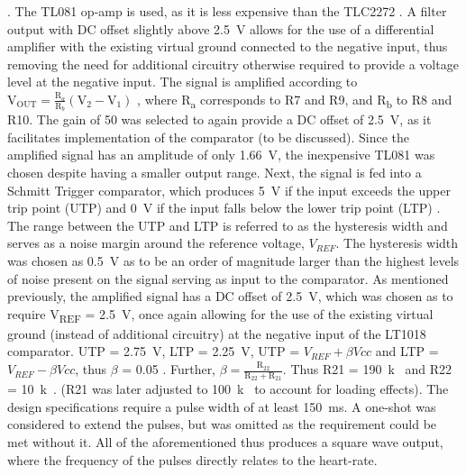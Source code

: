 \cite{filter}. The TL081 op-amp is used, as it is less expensive than the TLC2272 \cite{octo}. A filter output with DC offset slightly above \SI{2.5}{V} allows for the use of a differential amplifier with the existing virtual ground connected to the negative input, thus removing the need for additional circuitry otherwise required to provide a voltage level at the negative input. The signal is amplified according to $\mathrm{V}_{\mathrm{OUT}}=\frac{\mathrm{R}_{a}}{\mathrm{R}_{b}}\left(\mathrm{V}_{2}-\mathrm{V}_{1}\right)$ \cite{opamp}, where R\textsubscript{a} corresponds to R7 and R9, and R\textsubscript{b} to R8 and R10. The gain of 50 was selected to again provide a DC offset of \SI{2.5}{V}, as it facilitates implementation of the comparator (to be discussed). Since the amplified signal has an amplitude of only \SI{1.66}{V}, the inexpensive TL081 was chosen despite having a smaller output range. Next, the signal is fed into a Schmitt Trigger comparator, which produces \SI{5}{V} if the input exceeds the upper trip point (UTP) and \SI{0}{V} if the input falls below the lower trip point (LTP) \cite{schmitt}. The range between the UTP and LTP is referred to as the hysteresis width and serves as a noise margin \cite{schmitt} around the reference voltage, $V_{REF}$. The hysteresis width was chosen as \SI{0.5}{V} as to be an order of magnitude larger than the highest levels of noise present on the signal serving as input to the comparator. As mentioned previously, the amplified signal has a DC offset of \SI{2.5}{V}, which was chosen as to require V\textsubscript{REF} = \SI{2.5}{V}, once again allowing for the use of the existing virtual ground (instead of additional circuitry) at the negative input of the LT1018 comparator. UTP = \SI{2.75}{V}, LTP = \SI{2.25}{V}, UTP = $V_{REF} + \beta Vcc$ and LTP = $V_{REF} - \beta Vcc$, thus $\beta$ = 0.05 \cite{schmitt}. Further, $\beta=\frac{\mathrm{R}_{22}}{\mathrm{R}_{22}+\mathrm{R}_{21}}$. Thus R21 = \SI{190}{k\Omega} and R22 = \SI{10}{k\Omega}. (R21 was later adjusted to \SI{100}{k\Omega} to account for loading effects). The design specifications require a pulse width of at least \SI{150}{ms}. A one-shot was considered to extend the pulses, but was omitted as the requirement could be met without it. All of the aforementioned thus produces a square wave output, where the frequency of the pulses directly relates to the heart-rate. \\\\\\\\


